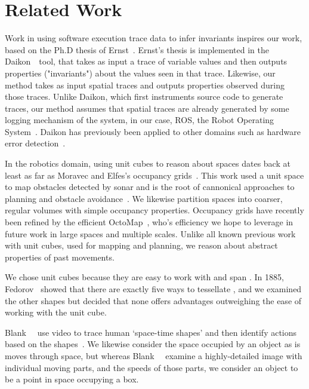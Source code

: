 \section{Related Work}
\label{sec:related}


Work in using software execution trace data to infer invariants inspires our work, based on the Ph.D thesis of Ernst~\cite{ernst2000dynamically}.
Ernst's thesis is implemented in the Daikon~\cite{ernst2007daikon}~tool, that takes as input a trace of variable values and then outputs properties ("invariants") about the values seen in that trace.
Likewise, our method takes as input spatial traces and outputs properties observed during those traces.
Unlike Daikon, which first instruments source code to generate traces, our method assumes that spatial traces are already generated by some logging mechanism of the system, in our case, ROS, the Robot Operating System~\cite{quigley2009ros}.
Daikon has previously been applied to other domains such as hardware error detection~\cite{sahoo2008using}.

In the robotics domain, using unit cubes to reason about spaces dates back at least as far as Moravec and Elfes's occupancy grids~\cite{moravec1985high}.
This work used a unit space to map obstacles detected by sonar and is the root of cannonical approaches to planning and obstacle avoidance~\cite{siegwart2011introduction,elfes1989using,borenstein1989real}.
We likewise partition spaces into coarser, regular volumes with simple occupancy properties.
Occupancy grids have recently been refined by the efficient OctoMap~\cite{wurm2010octomap}, who's efficiency we hope to leverage in future work in large spaces and multiple scales.
Unlike all known previous work with unit cubes, used for mapping and planning, we reason about abstract properties of past movements.

We chose unit cubes because they are easy to work with and span \rthree. 
In 1885, Fedorov~\cite{fedorov1885elements} showed that there are exactly five ways to tessellate \rthree, and we examined the other shapes but decided that none offers advantages outweighing the ease of working with the unit cube.

Blank~\etal~ use video to trace human `space-time shapes' and then identify actions based on the shapes~\cite{blank2005actions}.
We likewise consider the space occupied by an object as is moves through space, but whereas Blank~\etal~ examine a highly-detailed image with individual moving parts, and the speeds of those parts, we consider an object to be a point in space occupying a box.


